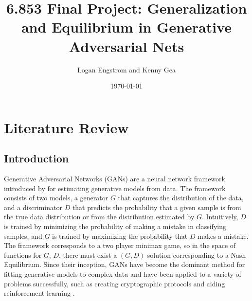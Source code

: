 \documentclass{article}
\title{6.853 Final Project: Generalization and Equilibrium in Generative Adversarial Nets}
\author{Logan Engstrom and Kenny Gea}
\date{\today}
\begin{document}
\maketitle

\section{Literature Review}
\subsection{Introduction}
Generative Adversarial Networks (GANs) are a neural network framework introduced by \citet{Goodfellow2014} for estimating generative models from data. The framework consists of two models, a generator $G$ that captures the distribution of the data, and a discriminator $D$ that predicts the probability that a given sample is from the true data distribution or from the distribution estimated by $G$. Intuitively, $D$ is trained by minimizing the probability of making a mistake in classifying samples, and $G$ is trained by maximizing the probability that $D$ makes a mistake. The framework corresponds to a two player minimax game, so in the space of functions for $G$, $D$, there must exist a $(G,D)$ solution corresponding to a Nash Equilibrium. Since their inception, GANs have become the dominant method for fitting generative models to complex data \citep{Arora17} and have been applied to a variety of problems successfully, such as creating cryptographic protocols \citep{Abadi16} and aiding reinforcement learning \citep{FinnGL16}.
\end{document}
